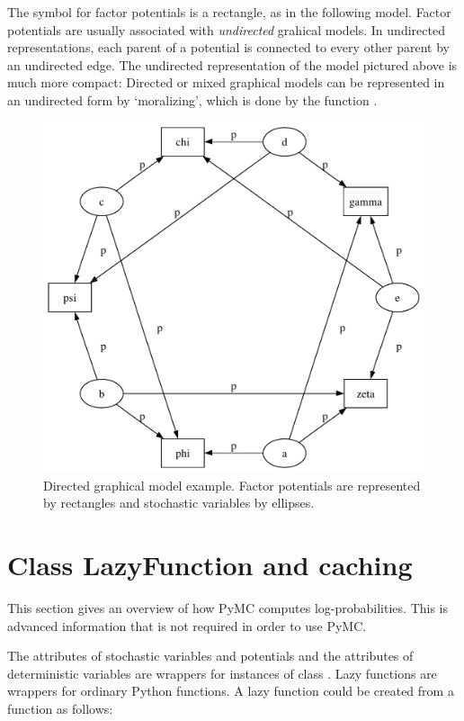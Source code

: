 \documentclass[letterpaper,10pt,english]{sphinxmanual}
\begin{document}
The symbol for factor potentials is a rectangle, as in the following model.
Factor potentials are usually associated with \emph{undirected} grahical models. In
undirected representations, each parent of a potential is connected to every
other parent by an undirected edge. The undirected representation of the model
pictured above is much more compact: Directed or mixed graphical models can be
represented in an undirected form by `moralizing', which is done by the function .
\begin{figure}[htbp]
\centering
\capstart

\includegraphics{PotExample.pdf}
\caption{Directed graphical model example. Factor potentials are represented by rectangles and stochastic variables by ellipses.}\label{modelbuilding:pot}\end{figure}


\section{Class LazyFunction and caching}
\label{modelbuilding:class-lazyfunction-and-caching}\label{modelbuilding:sec-caching}
This section gives an overview of how PyMC computes log-probabilities. This is advanced information that is not required in order to use PyMC.

The  attributes of stochastic variables and potentials and the  attributes of deterministic variables are wrappers for instances of class . Lazy functions are wrappers for ordinary Python functions. A lazy function  could be created from a function  as follows:
\end{document}

